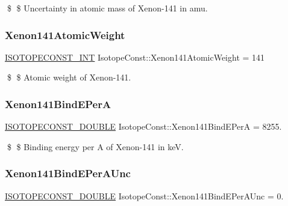 \$ \$ Uncertainty in atomic mass of Xenon-\/141 in amu. \mbox{\label{group___isotope_const-_xenon-_xe141_gaa863bd74da78517e4ddb2b220069703d}} 
\subsubsection{\texorpdfstring{Xenon141\+Atomic\+Weight}{Xenon141AtomicWeight}}
{\footnotesize\ttfamily \mbox{\hyperlink{group___isotope_const-_macros_ga5f18360b3e99483a35c32d789e62621c}{I\+S\+O\+T\+O\+P\+E\+C\+O\+N\+S\+T\+\_\+\+I\+NT}} Isotope\+Const\+::\+Xenon141\+Atomic\+Weight = 141}

\$ \$ Atomic weight of Xenon-\/141. \mbox{\label{group___isotope_const-_xenon-_xe141_gadedb22984264db895e224a1be4ebf795}} 
\subsubsection{\texorpdfstring{Xenon141\+Bind\+E\+PerA}{Xenon141BindEPerA}}
{\footnotesize\ttfamily \mbox{\hyperlink{group___isotope_const-_macros_ga8f45a7272ce02c0b4c65c44636ed719a}{I\+S\+O\+T\+O\+P\+E\+C\+O\+N\+S\+T\+\_\+\+D\+O\+U\+B\+LE}} Isotope\+Const\+::\+Xenon141\+Bind\+E\+PerA = 8255.}

\$ \$ Binding energy per A of Xenon-\/141 in keV. \mbox{\label{group___isotope_const-_xenon-_xe141_gac02cbce30a336a67077c3444caf95992}} 
\subsubsection{\texorpdfstring{Xenon141\+Bind\+E\+Per\+A\+Unc}{Xenon141BindEPerAUnc}}
{\footnotesize\ttfamily \mbox{\hyperlink{group___isotope_const-_macros_ga8f45a7272ce02c0b4c65c44636ed719a}{I\+S\+O\+T\+O\+P\+E\+C\+O\+N\+S\+T\+\_\+\+D\+O\+U\+B\+LE}} Isotope\+Const\+::\+Xenon141\+Bind\+E\+Per\+A\+Unc = 0.}


